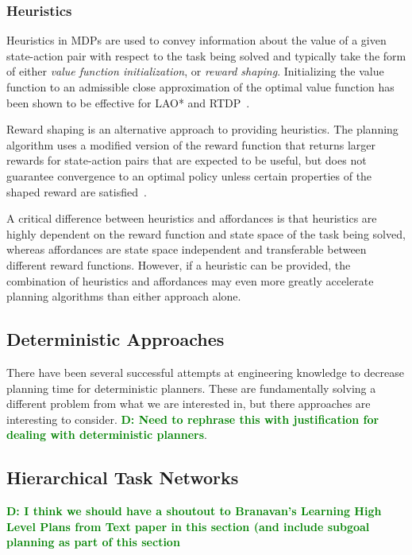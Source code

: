 \documentclass[conference]{IEEEtran}
\newcommand{\dnote}[1]{\textcolor{Green}{\textbf{D: #1}}}
\begin{document}
\subsubsection{Heuristics}
Heuristics in MDPs are used to convey information about the value of a given state-action pair with respect to the task being solved and typically take the form of either {\em value function initialization},
or {\em reward shaping}. Initializing the value function to an admissible close approximation of the optimal value function has been shown to be effective for LAO* and RTDP~\cite{Hansen:1999qf}.

Reward shaping is an alternative approach to providing heuristics. The planning algorithm uses a modified version of the reward function that returns larger rewards for state-action pairs that are expected to be useful, but does not guarantee convergence to an optimal policy unless certain properties of the shaped reward are satisfied~\cite{potshap}.

A critical difference between heuristics and affordances is that heuristics are highly dependent on the reward function and state space of the task being solved, whereas affordances are state space independent and transferable between different reward functions. However, if a heuristic can be provided, the combination of heuristics and affordances may even more greatly accelerate planning algorithms than either approach alone.

\subsection{Deterministic Approaches}

There have been several successful attempts at engineering knowledge to
decrease planning time for deterministic planners. These are fundamentally solving
a different problem from what we are interested in, but there approaches are interesting to consider.
\dnote{Need to rephrase this with justification for dealing with deterministic planners}.

\subsection{Hierarchical Task Networks}

\dnote{I think we should have a shoutout to Branavan's Learning High Level Plans from Text paper in this section (and include subgoal planning as part of this section}
\end{document}
